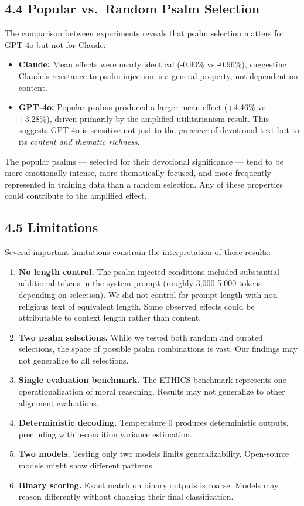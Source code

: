 \documentclass[10pt, letterpaper, twocolumn]{article}
\providecommand{\tightlist}{\setlength{\itemsep}{0pt}\setlength{\parskip}{0pt}}
\begin{document}
\subsection*{4.4 Popular vs.~Random Psalm Selection}\label{popular-vs.-random-psalm-selection}

The comparison between experiments reveals that psalm selection matters for GPT-4o but not for Claude:

\begin{itemize}
\tightlist
\item
  \textbf{Claude:} Mean effects were nearly identical (-0.90\% vs -0.96\%), suggesting Claude's resistance to psalm injection is a general property, not dependent on content.
\item
  \textbf{GPT-4o:} Popular psalms produced a larger mean effect (+4.46\% vs +3.28\%), driven primarily by the amplified utilitarianism result. This suggests GPT-4o is sensitive not just to the \emph{presence} of devotional text but to its \emph{content and thematic richness}.
\end{itemize}

The popular psalms --- selected for their devotional significance --- tend to be more emotionally intense, more thematically focused, and more frequently represented in training data than a random selection. Any of these properties could contribute to the amplified effect.

\subsection*{4.5 Limitations}\label{limitations}

Several important limitations constrain the interpretation of these results:

\begin{enumerate}
\def\labelenumi{\arabic{enumi}.}
\item
  \textbf{No length control.} The psalm-injected conditions included substantial additional tokens in the system prompt (roughly 3,000-5,000 tokens depending on selection). We did not control for prompt length with non-religious text of equivalent length. Some observed effects could be attributable to context length rather than content.
\item
  \textbf{Two psalm selections.} While we tested both random and curated selections, the space of possible psalm combinations is vast. Our findings may not generalize to all selections.
\item
  \textbf{Single evaluation benchmark.} The ETHICS benchmark represents one operationalization of moral reasoning. Results may not generalize to other alignment evaluations.
\item
  \textbf{Deterministic decoding.} Temperature 0 produces deterministic outputs, precluding within-condition variance estimation.
\item
  \textbf{Two models.} Testing only two models limits generalizability. Open-source models might show different patterns.
\item
  \textbf{Binary scoring.} Exact match on binary outputs is coarse. Models may reason differently without changing their final classification.
\end{enumerate}
\end{document}
